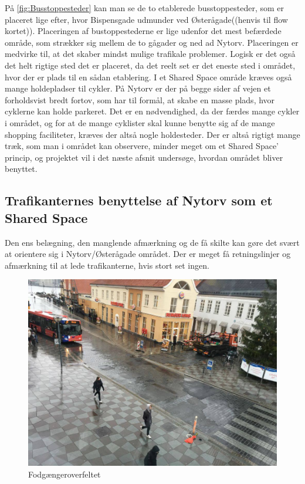 På \cref{fig:Busstoppesteder} kan man se de to etablerede busstoppesteder, som er placeret lige efter, hvor Bispensgade udmunder ved Østerågade((henvis til flow kortet)). Placeringen af bustoppestederne er lige udenfor det mest befærdede område, som strækker sig mellem de to gågader og ned ad Nytorv. Placeringen er medvirke til, at det skaber mindst mulige trafikale problemer. Logisk er det også det helt rigtige sted det er placeret, da det reelt set er det eneste sted i området, hvor der er plads til en sådan etablering.
I et Shared Space område kræves også mange holdepladser til cykler. På Nytorv er der på begge sider af vejen et forholdsvist bredt fortov, som har til formål, at skabe en masse plads, hvor cyklerne kan holde parkeret. Det er en nødvendighed, da der færdes mange cykler i området, og for at de mange cyklister skal kunne benytte sig af de mange shopping faciliteter, kræves der altså nogle holdesteder. %
Der er altså rigtigt mange træk, som man i området kan observere, minder meget om et Shared Space’ princip, og projektet vil i det næste afsnit undersøge, hvordan området bliver benyttet.

\subsection{Trafikanternes benyttelse af Nytorv som et Shared Space}
\label{benyttelse_omrade}
Den ens belægning, den manglende afmærkning og de få skilte kan gøre det svært at orientere sig i Nytorv/Østerågade området. Der er meget få retningslinjer og afmærkning til at lede trafikanterne, hvis stort set ingen.

\begin{figure}[htbp]
   \label{fig:Fodfelt}
   \centering
   \begin{adjustbox}{max width=\textwidth}
     \includegraphics[scale=0.3]{billederogfigur/Fodfelt.jpg}
  \end{adjustbox}
   \caption{Fodgængeroverfeltet}
 \end{figure}

